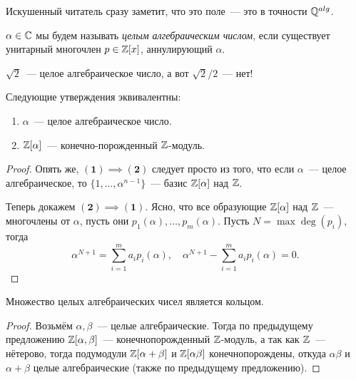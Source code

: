 	\begin{remark}
		Искушенный читатель сразу заметит, что это поле~--- это в точности $\mathbb{Q}^{alg}$.
	\end{remark}

	\begin{definition} 
		$\alpha \in \mathbb{C}$ мы будем называть \emph{целым алгебраическим числом}, если существует унитарный многочлен $p \in \mathbb{Z}[x]$, аннулирующий $\alpha$.
	\end{definition}

	\begin{example}
		$\sqrt{2}$~--- целое алгебраическое число, а вот $\sqrt{2}/2$~--- нет!
	\end{example}

	\begin{statement} 
		Следующие утверждения эквивалентны: 
		\begin{enumerate}
			\item $\alpha$~--- целое алгебраическое число. 
			\item $\mathbb{Z}[\alpha]$~--- конечно-порожденный $\mathbb{Z}$-модуль. 
		\end{enumerate}
	\end{statement}

	\begin{proof}
		Опять же, $\mathbf{(1) \implies (2)}$ следует просто из того, что если $\alpha$~--- целое алгебраическое, то $\{ 1, \ldots, \alpha^{n - 1} \}$~--- базис $\mathbb{Z}[\alpha]$ над $\mathbb{Z}$. 

		Теперь докажем $\mathbf{(2) \implies (1)}$. Ясно, что все образующие $\mathbb{Z}[\alpha]$ над $\mathbb{Z}$~--- многочлены от $\alpha$, пусть они $p_1(\alpha), \ldots, p_m(\alpha)$. Пусть $N = \max{\deg(p_i)}$, тогда 
		\[
			\alpha^{N + 1} = \sum_{i = 1}^{m} a_i p_i(\alpha), \quad \alpha^{N + 1} - \sum_{i = 1}^{m} a_i p_i(\alpha) = 0.
		\]
	\end{proof}

	\begin{theorem} 
		Множество целых алгебраических чисел является кольцом. 
	\end{theorem}
	\begin{proof}
		Возьмём $\alpha, \beta$~--- целые алгебраические. Тогда по предыдущему предложению $\mathbb{Z}[\alpha, \beta]$~--- конечнопорожденный $\mathbb{Z}$-модуль, а так как $\mathbb{Z}$~--- нётерово, тогда подумодули $\mathbb{Z}[\alpha + \beta]$ и $\mathbb{Z}[\alpha \beta]$ конечнопорождены, откуда $\alpha\beta$ и $\alpha + \beta$ целые алгебраические (также по предыдущему предложению). 
	\end{proof}

